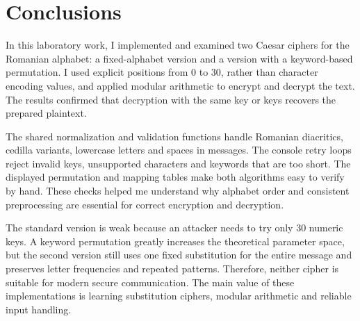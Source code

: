 \chapter{Conclusions}
In this laboratory work, I implemented and examined two Caesar ciphers for
the Romanian alphabet: a fixed-alphabet version and a version with a
keyword-based permutation. I used explicit positions from 0 to 30, rather
than character encoding values, and applied modular arithmetic to encrypt
and decrypt the text. The results confirmed that decryption with the same
key or keys recovers the prepared plaintext.

The shared normalization and validation functions handle Romanian
diacritics, cedilla variants, lowercase letters and spaces in messages.
The console retry loops reject invalid keys, unsupported characters and
keywords that are too short. The displayed permutation and mapping tables
make both algorithms easy to verify by hand. These checks helped me
understand why alphabet order and consistent preprocessing are essential
for correct encryption and decryption.

The standard version is weak because an attacker needs to try only 30
numeric keys. A keyword permutation greatly increases the theoretical
parameter space, but the second version still uses one fixed substitution
for the entire message and preserves letter frequencies and repeated
patterns. Therefore, neither cipher is suitable for modern secure
communication. The main value of these implementations is learning
substitution ciphers, modular arithmetic and reliable input handling.
